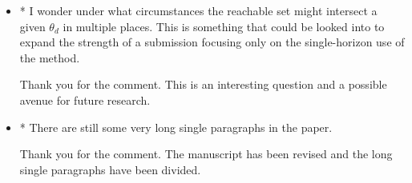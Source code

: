 \documentclass[11pt]{article}
\begin{document}
\begin{itemize}
    \item
        \begin{itshape}

            * I wonder under what circumstances the reachable set might intersect a
            given $\theta_d$ in multiple places.  This is something that could be looked
            into to expand the strength of a submission focusing only on the
            single-horizon use of the method.
        \end{itshape}
        
        Thank you for the comment.
        This is an interesting question and a possible avenue for future research.

    \item 
        \begin{itshape}

            * There are still some very long single paragraphs in the paper.
        \end{itshape}
        
        Thank you for the comment. 
        The manuscript has been revised and the long single paragraphs have been divided.
\end{itemize}



\end{document}
